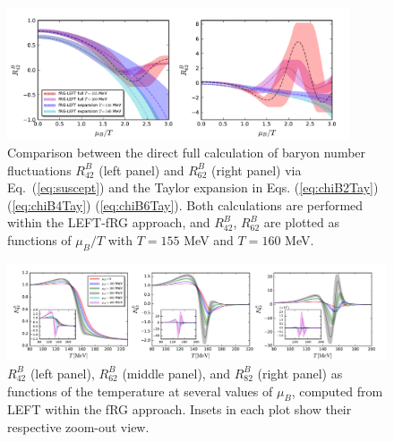 \documentclass[%
reprint,
superscriptaddress,
showpacs,preprintnumbers,
amsmath,amssymb,
aps,
prd,
]{revtex4-1}
\def\Eq#1{Eq.~(\ref{#1})}
\begin{document}
	\begin{figure}[t]
		\includegraphics[width=0.9\textwidth]{R42R62expansion-muBoT}
		\caption{Comparison between the direct full calculation of baryon number fluctuations $R^{B}_{42}$ (left panel) and $R^{B}_{62}$ (right panel) via \Eq{eq:suscept} and the Taylor expansion in Eqs. (\ref{eq:chiB2Tay})  (\ref{eq:chiB4Tay})  (\ref{eq:chiB6Tay}). Both calculations are performed within the LEFT-fRG approach, and $R^{B}_{42}$, $R^{B}_{62}$ are plotted as functions of $\mu_B/T$ with $T=155$ MeV and $T=160$ MeV.}\label{fig:R42R62expansion-muBoT}
	\end{figure}
	
	\begin{figure}[t]
		\includegraphics[width=1.\textwidth]{R42R62R82-T-muB0to400}
		\caption{$R^{B}_{42}$ (left panel), $R^{B}_{62}$ (middle panel), and $R^{B}_{82}$ (right panel) as functions of the temperature at several values of $\mu_B$, computed from LEFT within the fRG approach. Insets in each plot show their respective zoom-out view.}\label{fig:R42R62R82-T-muB0to400}
	\end{figure}
	
\end{document}
